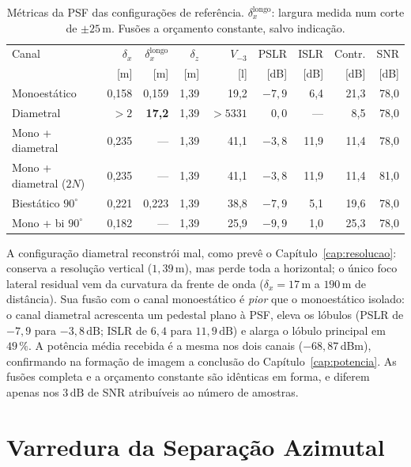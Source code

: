 \documentclass[12pt,a4paper,oneside]{book}
\theoremstyle{remark}
\newcommand{\dB}{\,\mathrm{dB}}
\theoremstyle{plain}
\theoremstyle{definition}
\begin{document}
\begin{table}[H]
\centering\small
\caption{Métricas da PSF das configurações de referência. $\delta_x^{\text{longo}}$:
largura medida num corte de $\pm25\,$m. Fusões a orçamento constante, salvo
indicação.}
\label{tab:geo_ref}
\begin{tabular}{@{}lrrrrrrrr@{}}
\toprule
Canal & $\delta_x$ & $\delta_x^{\text{longo}}$ & $\delta_z$ & $V_{-3}$ & PSLR & ISLR & Contr. & SNR \\
      & [m] & [m] & [m] & [l] & [dB] & [dB] & [dB] & [dB] \\
\midrule
Monoestático              & 0,158 & 0,159 & 1,39 & 19,2 & $-7,9$ & 6,4 & 21,3 & 78,0 \\
Diametral                 & $>2$ & \textbf{17,2} & 1,39 & $>5331$ & $0,0$ & --- & 8,5 & 78,0 \\
Mono + diametral          & 0,235 & --- & 1,39 & 41,1 & $-3,8$ & 11,9 & 11,4 & 78,0 \\
Mono + diametral ($2N$)   & 0,235 & --- & 1,39 & 41,1 & $-3,8$ & 11,9 & 11,4 & 81,0 \\
\midrule
Biestático $90^\circ$     & 0,221 & 0,223 & 1,39 & 38,8 & $-7,9$ & 5,1 & 19,6 & 78,0 \\
Mono + bi $90^\circ$      & 0,182 & --- & 1,39 & 25,9 & $-9,9$ & 1,0 & 25,3 & 78,0 \\
\bottomrule
\end{tabular}
\end{table}

A configuração diametral reconstrói mal, como prevê o
Capítulo~\ref{cap:resolucao}: conserva a resolução vertical ($1,39\,$m), mas perde
toda a horizontal; o único foco lateral residual vem da curvatura da frente de
onda ($\delta_x=17\,$m a $190\,$m de distância). Sua fusão com o canal
monoestático é \emph{pior} que o monoestático isolado: o canal diametral
acrescenta um pedestal plano à PSF, eleva os lóbulos (PSLR de $-7,9$ para
$-3,8\dB$; ISLR de $6,4$ para $11,9\dB$) e alarga o lóbulo principal em $49\,\%$.
A potência média recebida é a mesma nos dois canais ($-68,87\,$dBm), confirmando
na formação de imagem a conclusão do Capítulo~\ref{cap:potencia}. As fusões
completa e a orçamento constante são idênticas em forma, e diferem apenas nos
$3\dB$ de SNR atribuíveis ao número de amostras.

\section{Varredura da Separação Azimutal}
\label{sec:geo_varredura}
\end{document}
